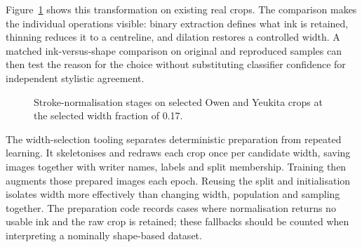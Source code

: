 Figure~\ref{fig:des-strokenorm} shows this transformation on existing real crops. The comparison makes the individual operations visible: binary extraction defines what ink is retained, thinning reduces it to a centreline, and dilation restores a controlled width. A matched ink-versus-shape comparison on original and reproduced samples can then test the reason for the choice without substituting classifier confidence for independent stylistic agreement.
\begin{figure}[!htbp]\centering
{}
\caption{Stroke-normalisation stages on selected Owen and Yeukita crops at the selected width fraction of 0.17.}
\label{fig:des-strokenorm}
\end{figure}

The width-selection tooling separates deterministic preparation from repeated learning. It skeletonises and redraws each crop once per candidate width, saving images together with writer names, labels and split membership. Training then augments those prepared images each epoch. Reusing the split and initialisation isolates width more effectively than changing width, population and sampling together. The preparation code records cases where normalisation returns no usable ink and the raw crop is retained; these fallbacks should be counted when interpreting a nominally shape-based dataset.

